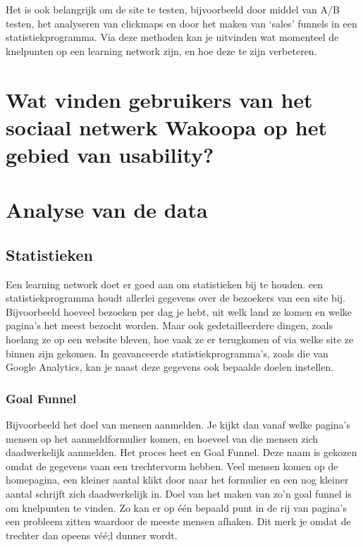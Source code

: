 \documentclass[a4paper, 10pt, pdftex]{report}
\begin{document}
    Het is ook belangrijk om de site te testen, bijvoorbeeld door middel van A/B testen, het analyseren van clickmaps en door het maken van `sales' funnels in een statistiekprogramma. Via deze methoden kan je uitvinden wat momenteel de knelpunten op een learning network zijn, en hoe deze te zijn verbeteren.


  \newpage
  \chapter{Wat vinden gebruikers van het sociaal netwerk Wakoopa op het gebied van usability?}
    \label{userchapter}
    \newpage

  \newpage
  \chapter{Analyse van de data}
    \label{datachapter}
    \newpage
    \section{Statistieken}
    Een learning network doet er goed aan om statistieken bij te houden. een statistiekprogramma houdt allerlei gegevens over de bezoekers van een site bij. Bijvoorbeeld hoeveel bezoeken per dag je hebt, uit welk land ze komen en welke pagina's het meest bezocht worden. Maar ook gedetailleerdere dingen, zoals hoelang ze op een website bleven, hoe vaak ze er terugkomen of via welke site ze binnen zijn gekomen. In geavanceerde statistiekprogramma's, zoals die van Google Analytics, kan je naast deze gegevens ook bepaalde doelen instellen.

    \subsection{Goal Funnel}
    Bijvoorbeeld het doel van mensen aanmelden. Je kijkt dan vanaf welke pagina's mensen op het aanmeldformulier komen, en hoeveel van die mensen zich daadwerkelijk aanmelden. Het proces heet en Goal Funnel. Deze naam is gekozen omdat de gegevens vaan een trechtervorm hebben. Veel mensen komen op de homepagina, een kleiner aantal klikt door naar het formulier en een nog kleiner aantal schrijft zich daadwerkelijk in. Doel van het maken van zo'n goal funnel is om knelpunten te vinden. Zo kan er op \'e\'en bepaald punt in de rij van pagina's een probleem zitten waardoor de meeste mensen afhaken. Dit merk je omdat de trechter dan opeens v\'e\'e;l dunner wordt.
\end{document}
